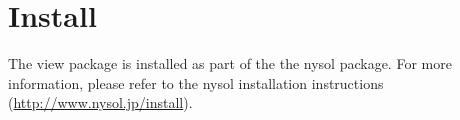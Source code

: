 
%

\section{Install\label{sect:install}}

The view package is installed as part of the the nysol package. 
For more information, please refer to the nysol installation instructions (\url{http://www.nysol.jp/install}). 

